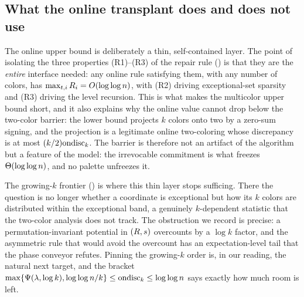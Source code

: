 \subsection{What the online transplant does and does not use}\label{sec:disc-online}

The online upper bound is deliberately a thin, self-contained layer. The point of isolating the three properties (R1)--(R3)
of the repair rule () is that they are the \emph{entire} interface needed: any online rule satisfying
them, with any number of colors, has $\max_{t,i}R_i=O(\log\log n)$, with (R2) driving exceptional-set sparsity and
(R3) driving the level recursion. This is what makes the multicolor upper bound short, and it also explains why the online value cannot
drop below the two-color barrier: the lower bound projects $k$ colors onto two by a zero-sum signing, and the projection is a
legitimate online two-coloring whose discrepancy is at most $(k/2)\mathrm{ondisc}_k$. The barrier is therefore not an artifact of the
algorithm but a feature of the model: the irrevocable commitment is what freezes $\Theta(\log\log n)$, and no palette unfreezes
it.

The growing-$k$ frontier () is where this thin layer stops sufficing. There the question is no longer whether
a coordinate is exceptional but how its $k$ colors are distributed within the exceptional band, a genuinely $k$-dependent
statistic that the two-color analysis does not track. The obstruction we record is precise: a permutation-invariant potential
in $(R,s)$ overcounts by a $\log k$ factor, and the asymmetric rule that would avoid the overcount has an
expectation-level tail that the phase conveyor refutes. Pinning the growing-$k$ order is, in our reading, the natural next
target, and the bracket $\max\{\Psi(\lambda,\log k),\log\log n/k\}\le\mathrm{ondisc}_k\le\log\log n$ says exactly how much room is left.
